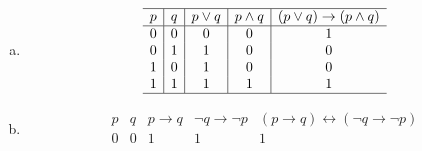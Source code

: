 {{\begin{practices}
\begin{enumerate}[a)]
{\begin{table}[H]
                        \[
                            \begin{array}{c|c|c|c|c}
                                \hline
                                p & q & \neg q & p \vee \neg q & p \vee \neg q \rightarrow q\\
                                \hline
                                0 & 0 & 1 & 1 & 0 \\
                                0 & 1 & 0 & 0 & 1 \\
                                1 & 0 & 1 & 1 & 0 \\
                                1 & 1 & 0 & 1 & 1 \\
                                \hline
                            \end{array}
                        \]
                    \end{table}
                }
                \item
                {
                    \begin{table}[H]
                        \[
                            \begin{array}{c|c|c|c|c}
                                \hline
                                p & q & p \vee q & p \wedge q & (p \vee q) \rightarrow (p \wedge q)\\
                                \hline
                                0 & 0 & 0 & 0 & 1 \\
                                0 & 1 & 1 & 0 & 0 \\
                                1 & 0 & 1 & 0 & 0 \\
                                1 & 1 & 1 & 1 & 1 \\
                                \hline
                            \end{array}
                        \]
                    \end{table}
                }
                \item
                {
                    \begin{table}[H]
                        \[
                            \begin{array}{c|c|c|c|c}
                                \hline
                                p & q & p \rightarrow q & \neg q \rightarrow \neg p & (p \rightarrow q) \leftrightarrow (\neg q \rightarrow \neg p) \\
                                \hline
                                0 & 0 & 1 & 1 & 1 \\

\end{array}\]
\end{table}}
\end{enumerate}
\end{practices}}}
